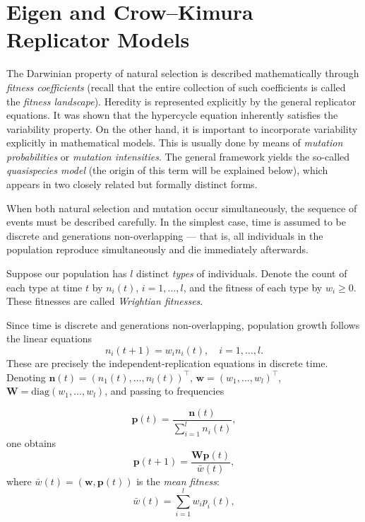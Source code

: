 \documentclass[12pt]{report}
\newcommand{\bs}[1]{\bm{#1}}
\theoremstyle{definition}
\theoremstyle{remark}
\begin{document}
\section{Eigen and Crow--Kimura Replicator Models}
\label{c1:section:1.5}

The Darwinian property of natural selection is described
mathematically through \emph{fitness coefficients}
(recall that the entire collection of such coefficients is called
the \emph{fitness landscape}).  Heredity is represented explicitly
by the general replicator equations.  It was shown that the hypercycle
equation inherently satisfies the variability property.  On the other
hand, it is important to incorporate variability explicitly in
mathematical models.  This is usually done by means of
\emph{mutation probabilities} or \emph{mutation intensities}.
The general framework yields the so-called \emph{quasispecies model}
(the origin of this term will be explained below), which appears in
two closely related but formally distinct forms.

When both natural selection and mutation occur simultaneously, the
sequence of events must be described carefully.  In the simplest case,
time is assumed to be discrete and generations non-overlapping —
that is, all individuals in the population reproduce simultaneously
and die immediately afterwards.

Suppose our population has $l$ distinct \emph{types} of individuals.
Denote the count of each type at time $t$ by $n_i(t)$,
$i=1,\ldots,l$, and the fitness of each type by $w_i\geqslant 0$.
These fitnesses are called \emph{Wrightian fitnesses}.

Since time is discrete and generations non-overlapping, population
growth follows the linear equations
\begin{equation}
  n_i(t+1)=w_i n_i(t),\quad i=1,\ldots,l.
  \label{c1:eq1.26}
\end{equation}
These are precisely the independent-replication equations in discrete
time.  Denoting
$\bs{n}(t)=(n_1(t),\ldots,n_l(t))^\top$,
$\bs{w}=(w_1,\ldots,w_l)^\top$,
$\bs{W}=\mathrm{diag}(w_1,\ldots,w_l)$, and passing to frequencies

$$\bs{p}(t)=\frac{\bs{n}(t)}{\sum_{i=1}^l n_i(t)},$$ one obtains
\begin{equation}
  \bs{p}(t+1)=\frac{\bs{W}\bs{p}(t)}{\bar{w}(t)},
  \label{c1:eq1.27}
\end{equation}
where $\bar{w}(t)=(\bs{w},\bs{p}(t))$ is the \emph{mean fitness}:
$$
\bar{w}(t)=\sum\limits_{i=1}^l w_ip_i(t),
$$ 
\end{document}
